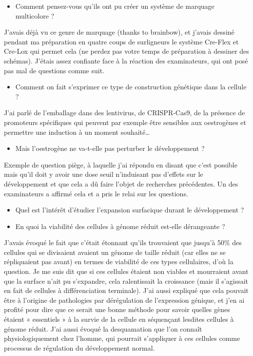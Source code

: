 \begin{itemize}
    \item Comment pensez-vous qu’ils ont pu créer un système de marquage multicolore ? 
\end{itemize}

J’avais déjà vu ce genre de marquage (thanks to brainbow), et j’avais dessiné pendant ma préparation en quatre coups de surligneurs le système Cre-Flex et Cre-Lox qui permet cela (ne perdez pas votre temps de préparation à dessiner des schémas). J’étais assez confiante face à la réaction des examinateurs, qui ont posé pas mal de questions comme suit. 

\begin{itemize}
    \item Comment on fait s’exprimer ce type de construction génétique dans la cellule ? 
\end{itemize}

J’ai parlé de l’emballage dans des lentivirus, de CRISPR-Cas9, de la présence de promoteurs spécifiques qui peuvent par exemple être sensibles aux oestrogènes et permettre une induction à un moment souhaité…

\begin{itemize}
    \item Mais l’oestrogène ne va-t-elle pas perturber le développement ? 
\end{itemize}

Exemple de question piège, à laquelle j’ai répondu en disant que c’est possible mais qu’il doit y avoir une dose seuil n’induisant pas d’effets sur le développement et que cela a dû faire l’objet de recherches précédentes. Un des examinateurs a affirmé cela et a pris le relai sur les questions.  

\begin{itemize}
    \item Quel est l’intérêt d’étudier l’expansion surfacique durant le développement ? 
    \item En quoi la viabilité des cellules à génome réduit est-elle dérangeante ? 
\end{itemize}

J’avais évoqué le fait que c’était étonnant qu’ils trouvaient que jusqu’à 50\% des cellules qui se divisaient avaient un génome de taille réduit (car elles ne se répliquaient pas avant) en termes de viabilité de ces types cellulaires, d’où la question. Je me suis dit que si ces cellules étaient non viables et mourraient avant que la surface n’ait pu s’expandre, cela ralentissait la croissance (mais il s’agissait en fait de cellules à différenciation terminale). J’ai aussi expliqué que cela pouvait être à l’origine de pathologies par dérégulation de l’expression génique, et j’en ai profité pour dire que ce serait une bonne méthode pour savoir quelles gènes étaient « essentiels » à la survie de la cellule en séquençant lesdites cellules à génome réduit. J’ai aussi évoqué la desquamation que l’on connaît physiologiquement chez l’homme, qui pourrait s’appliquer à ces cellules comme processus de régulation du développement normal. 

